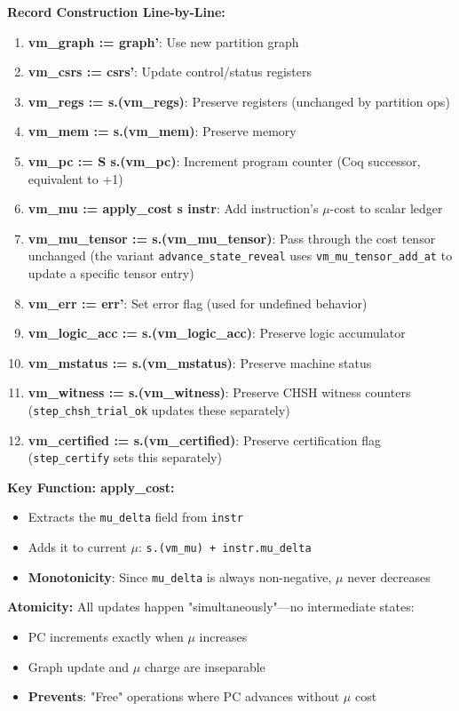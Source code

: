 \textbf{Record Construction Line-by-Line:}
\begin{enumerate}
    \item \textbf{vm\_graph := graph'}: Use new partition graph
    \item \textbf{vm\_csrs := csrs'}: Update control/status registers
    \item \textbf{vm\_regs := s.(vm\_regs)}: Preserve registers (unchanged by partition ops)
    \item \textbf{vm\_mem := s.(vm\_mem)}: Preserve memory
    \item \textbf{vm\_pc := S s.(vm\_pc)}: Increment program counter (Coq successor, equivalent to +1)
    \item \textbf{vm\_mu := apply\_cost s instr}: Add instruction's $\mu$-cost to scalar ledger
    \item \textbf{vm\_mu\_tensor := s.(vm\_mu\_tensor)}: Pass through the cost tensor unchanged (the variant \texttt{advance\_state\_reveal} uses \texttt{vm\_mu\_tensor\_add\_at} to update a specific tensor entry)
    \item \textbf{vm\_err := err'}: Set error flag (used for undefined behavior)
    \item \textbf{vm\_logic\_acc := s.(vm\_logic\_acc)}: Preserve logic accumulator
    \item \textbf{vm\_mstatus := s.(vm\_mstatus)}: Preserve machine status
    \item \textbf{vm\_witness := s.(vm\_witness)}: Preserve CHSH witness counters (\texttt{step\_chsh\_trial\_ok} updates these separately)
    \item \textbf{vm\_certified := s.(vm\_certified)}: Preserve certification flag (\texttt{step\_certify} sets this separately)
\end{enumerate}

\textbf{Key Function: apply\_cost:}
\begin{itemize}
    \item Extracts the \texttt{mu\_delta} field from \texttt{instr}
    \item Adds it to current $\mu$: \texttt{s.(vm\_mu) + instr.mu\_delta}
    \item \textbf{Monotonicity}: Since \texttt{mu\_delta} is always non-negative, $\mu$ never decreases
\end{itemize}

\textbf{Atomicity:} All updates happen "simultaneously"—no intermediate states:
\begin{itemize}
    \item PC increments exactly when $\mu$ increases
    \item Graph update and $\mu$ charge are inseparable
    \item \textbf{Prevents}: "Free" operations where PC advances without $\mu$ cost
\end{itemize}

